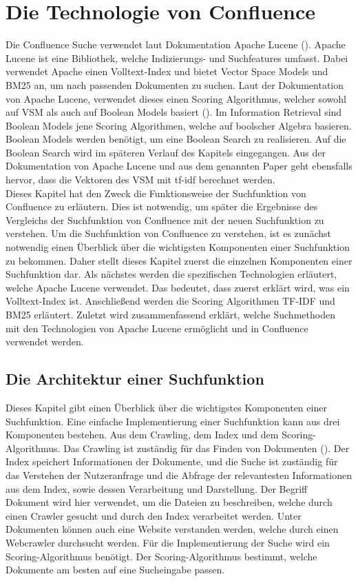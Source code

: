 \chapter{Die Technologie von Confluence}
\label{chap:technologie-von-confluence}
Die Confluence Suche verwendet laut Dokumentation Apache Lucene (\cite{Confluence_Ranking}).
Apache Lucene ist eine Bibliothek, welche Indizierungs- und Suchfeatures umfasst.
Dabei verwendet Apache einen Volltext-Index und bietet Vector Space Models und BM25 an, um nach passenden Dokumenten zu suchen.
Laut der Dokumentation von Apache Lucene, verwendet dieses einen Scoring Algorithmus, welcher sowohl auf VSM als auch auf Boolean Models basiert (\cite{Lucene_Scoring}).
Im Information Retrieval sind Boolean Models jene Scoring Algorithmen, welche auf boolscher Algebra basieren.
Boolean Models werden benötigt, um eine Boolean Search zu realisieren.
Auf die Boolean Search wird im späteren Verlauf des Kapitels eingegangen.
Aus der Dokumentation von Apache Lucene und aus dem genannten Paper geht ebensfalls hervor, dass die Vektoren des VSM mit tf-idf berechnet werden.\\

Dieses Kapitel hat den Zweck die Funktionsweise der Suchfunktion von Confluence zu erläutern.
Dies ist notwendig, um später die Ergebnisse des Vergleichs der Suchfunktion von Confluence mit der neuen Suchfunktion zu verstehen.
Um die Suchfunktion von Confluence zu verstehen, ist es zunächst notwendig einen Überblick über die wichtigsten Komponenten einer Suchfunktion zu bekommen.
Daher stellt dieses Kapitel zuerst die einzelnen Komponenten einer Suchfunktion dar.
Als nächstes werden die spezifischen Technologien erläutert, welche Apache Lucene verwendet.
Das bedeutet, dass zuerst erklärt wird, was ein Volltext-Index ist.
Anschließend werden die Scoring Algorithmen TF-IDF und BM25 erläutert.
Zuletzt wird zusammenfassend erklärt, welche Suchmethoden mit den Technologien von Apache Lucene ermöglicht und in Confluence verwendet werden.

\section{Die Architektur einer Suchfunktion}
Dieses Kapitel gibt einen Überblick über die wichtigstes Komponenten einer Suchfunktion.
Eine einfache Implementierung einer Suchfunktion kann aus drei Komponenten bestehen.
Aus dem Crawling, dem Index und dem Scoring-Algorithmus.
Das Crawling ist zuständig für das Finden von Dokumenten (\cite{Castillo_2005}).
Der Index speichert Informationen der Dokumente, und die Suche ist zuständig für das Verstehen der Nutzeranfrage und die Abfrage der relevantesten Informationen aus dem Index, sowie dessen Verarbeitung und Darstellung.
Der Begriff Dokument wird hier verwendet, um die Dateien zu beschreiben, welche durch einen Crawler gesucht und durch den Index verarbeitet werden.
Unter Dokumenten können auch eine Website verstanden werden, welche durch einen Webcrawler durchsucht werden.
Für die Implementierung der Suche wird ein Scoring-Algorithmus benötigt.
Der Scoring-Algorithmus bestimmt, welche Dokumente am besten auf eine Sucheingabe passen.\\

